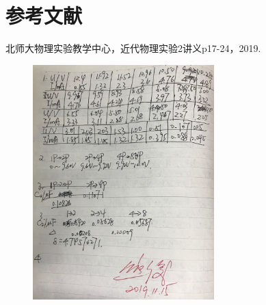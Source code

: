 \documentclass[UTF8]{ctexart}
\begin{document}
\section{参考文献}
\small
\noindent[1]北师大物理实验教学中心，近代物理实验2讲义p17-24，2019.

\begin{figure}[H]
\centering
\includegraphics[width=7cm]{record.jpg}
\end{figure}
\end{document}
